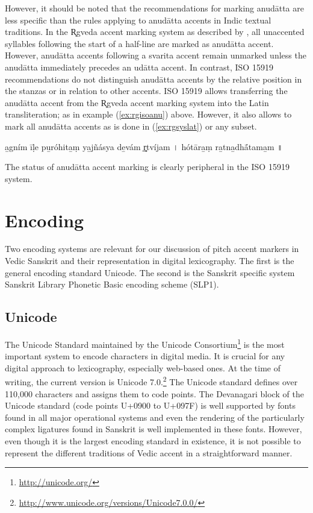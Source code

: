 However, it should be noted that the recommendations for marking anudātta are less specific than the rules applying to anudātta accents in Indic textual traditions. In the R̥gveda accent marking system as described by \citet[p.~449]{Macdonell1916}, all unaccented syllables following the start of a half-line are marked as anudātta accent. However, anudātta accents following a svarita accent remain unmarked unless the anudātta immediately precedes an udātta accent. In contrast, ISO 15919 recommendations do not distinguish anudātta accents by the relative position in the stanzas or in relation to other accents. ISO 15919 allows transferring the anudātta accent from the R̥gveda accent marking system into the Latin transliteration; as in example (\ref{ex:rgisoanu}) above. However, it also allows to mark all anudātta accents as is done in (\ref{ex:rgsyslat}) or any subset. 

\begin{exe}
\ex\label{ex:rgsyslat} a̲gním īḷe pu̲róhita̲ṃ ya̲jñásya de̲vám r̥̲tvíjam {\devfont ।} hótāra̲ṃ ra̲tna̲dhā́tama̲m {\devfont ॥}
\end{exe}

The status of anudātta accent marking is clearly peripheral in the ISO 15919 system.

\chapter{Encoding}

Two encoding systems are relevant for our discussion of pitch accent markers in Vedic Sanskrit and their representation in digital lexicography. The first is the general encoding standard Unicode. The second is the Sanskrit specific system Sanskrit Library Phonetic Basic encoding scheme (SLP1).

\section{Unicode}

The Unicode Standard maintained by the Unicode Consortium\footnote{\url{http://unicode.org/}} is the most important system to encode characters in digital media. It is crucial for any digital approach to lexicography, especially web-based ones. At the time of writing, the current version is Unicode 7.0.\footnote{\url{http://www.unicode.org/versions/Unicode7.0.0/}} The Unicode standard defines over 110,000 characters and assigns them to code points. The Devanagari block of the Unicode standard (code points U+0900 to U+097F) is well supported by fonts found in all major operational systems and even the rendering of the particularly complex ligatures found in Sanskrit is well implemented in these fonts. However, even though it is the largest encoding standard in existence, it is not possible to represent the different traditions of Vedic accent in a straightforward manner. 

